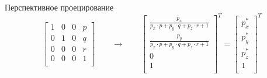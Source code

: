 \documentclass{beamer}
\begin{document}
\begin{frame}{Перспективное проецирование}
{				\[
					\begin{bmatrix}
						1 & 0 & 0 & p \\
						0 & 1 & 0 & q \\
						0 & 0 & 0 & r \\
						0 & 0 & 0 & 1 \\
					\end{bmatrix}	
					\qquad
					\to
					\qquad
					\begin{bmatrix}
						\frac{p_x}{p_x \cdot p + p_y \cdot q + p_z \cdot r+1} \\
						\frac{p_y}{p_x \cdot p + p_y \cdot q + p_z \cdot r+1} \\
						0 \\
						1	\\
					\end{bmatrix}^T
					=					
					\begin{bmatrix}
						p_x^* \\
						p_y^*	\\
						p_z^* \\
						1			\\
					\end{bmatrix}^T
				\]
			}
	\end{frame}
\end{document}
